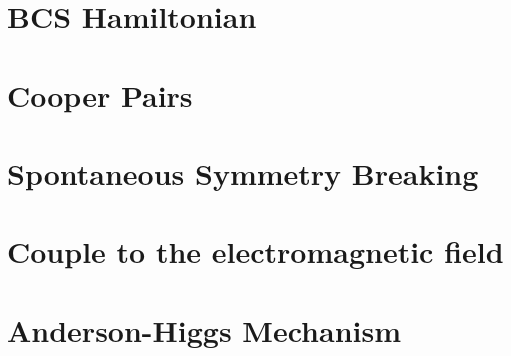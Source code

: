 \documentclass{article}
\begin{document}
\section{BCS Hamiltonian}

\section{Cooper Pairs}

\section{Spontaneous Symmetry Breaking}

\section{Couple to the electromagnetic field}

\section{Anderson-Higgs Mechanism}
\end{document}
